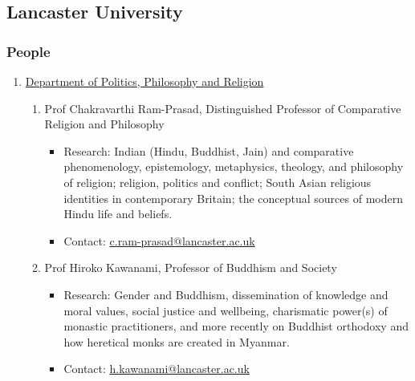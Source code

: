 \documentclass[a4paper,10.5pt]{article}
\begin{document}
\subsection{Lancaster University}
\label{sec:org3cd9459}
\subsubsection{People}
\label{sec:org9854952}
\begin{enumerate}
\item \href{https://www.lancaster.ac.uk/ppr/}{Department of Politics, Philosophy and Religion}
\label{sec:org94e8cd6}
\begin{enumerate}
\item Prof Chakravarthi Ram-Prasad, Distinguished Professor of Comparative Religion and Philosophy
\label{sec:org89328e4}
\begin{itemize}
\item Research: Indian (Hindu, Buddhist, Jain) and comparative phenomenology, epistemology, metaphysics, theology, and philosophy of religion; religion, politics and conflict; South Asian religious identities in contemporary Britain; the conceptual sources of modern Hindu life and beliefs.\\
\item Contact: \href{mailto:c.ram-prasad@lancaster.ac.uk}{c.ram-prasad@lancaster.ac.uk}\\
\end{itemize}
\item Prof Hiroko Kawanami, Professor of Buddhism and Society
\label{sec:orgd1666e7}
\begin{itemize}
\item Research: Gender and Buddhism, dissemination of knowledge and moral values, social justice and wellbeing, charismatic power(s) of monastic practitioners, and more recently on Buddhist orthodoxy and how heretical monks are created in Myanmar.\\
\item Contact: \href{mailto:h.kawanami@lancaster.ac.uk}{h.kawanami@lancaster.ac.uk}\\
\end{itemize}
\end{enumerate}
\end{enumerate}
\end{document}
